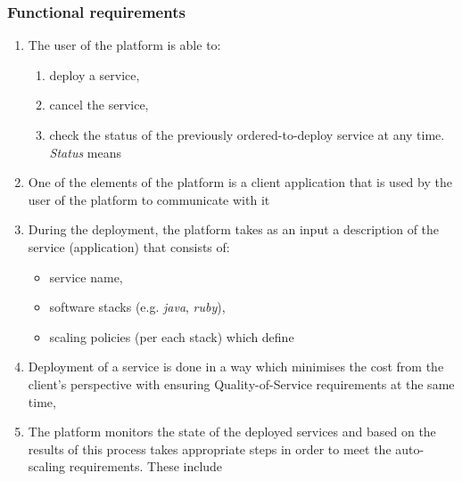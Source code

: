 \subsubsection{Functional requirements}
\begin{enumerate}
  \item The user of the platform is able to:
    \begin{enumerate}
      \item deploy a service,
      \item cancel the service,
      \item check the status of the previously ordered-to-deploy service at any time. \emph{Status} means 
    \end{enumerate}
  \item One of the elements of the platform is a client application that is used by the user of the platform to communicate with it
  \item During the deployment, the platform takes as an input a description of the service (application) that consists of:
    \begin{itemize}
    \item service name,
    \item software stacks (e.g. \emph{java}, \emph{ruby}),
    \item scaling policies (per each stack) which define
    \end{itemize}
  \item Deployment of a service is done in a way which minimises the cost from the client's perspective with ensuring Quality-of-Service requirements at the same time,
  \item The platform monitors the state of the deployed services and based on the results of this process takes appropriate steps in order to meet the auto-scaling requirements. These include
\end{enumerate}

